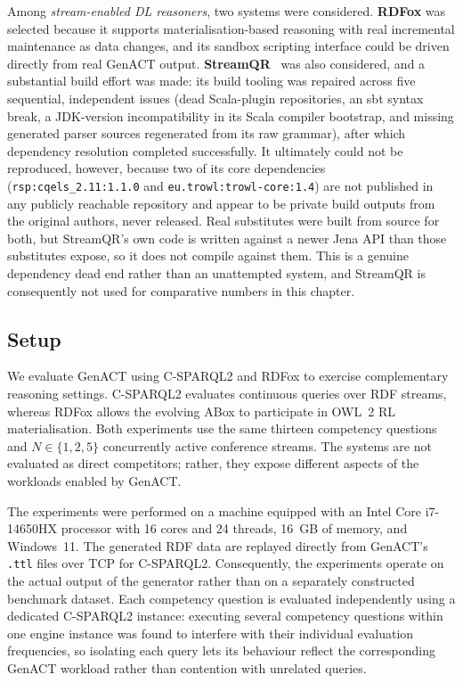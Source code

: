 Among \emph{stream-enabled DL reasoners}, two systems were considered.
\textbf{RDFox} was selected because it supports materialisation-based
reasoning with real incremental maintenance as data changes, and its sandbox
scripting interface could be driven directly from real GenACT output.
\textbf{StreamQR}~\cite{streamqr} was also considered, and a substantial
build effort was made: its build tooling was repaired across five sequential,
independent issues (dead Scala-plugin repositories, an sbt syntax break, a
JDK-version incompatibility in its Scala compiler bootstrap, and missing
generated parser sources regenerated from its raw grammar), after which
dependency resolution completed successfully. It ultimately could not be
reproduced, however, because two of its core dependencies
(\texttt{rsp:cqels\_2.11:1.1.0} and \texttt{eu.trowl:trowl-core:1.4}) are not
published in any publicly reachable repository and appear to be private build
outputs from the original authors, never released. Real substitutes were
built from source for both, but StreamQR's own code is written against a
newer Jena API than those substitutes expose, so it does not compile against
them. This is a genuine dependency dead end rather than an unattempted
system, and StreamQR is consequently not used for comparative numbers in this
chapter.


\subsection{Setup}
\label{subsec:genact-experimental-setup}

We evaluate GenACT using C-SPARQL2 and RDFox to exercise complementary
reasoning settings. C-SPARQL2 evaluates continuous queries over RDF streams,
whereas RDFox allows the evolving ABox to participate in OWL~2 RL
materialisation. Both experiments use the same thirteen competency questions
and $N\in\{1,2,5\}$ concurrently active conference streams. The systems are not
evaluated as direct competitors; rather, they expose different aspects of the
workloads enabled by GenACT.

The experiments were performed on a machine equipped with an Intel Core
i7-14650HX processor with 16 cores and 24 threads, 16~GB of memory, and
Windows~11. The generated RDF data are replayed directly from GenACT's
\texttt{.ttl} files over TCP for C-SPARQL2. Consequently, the experiments
operate on the actual output of the generator rather than on a separately
constructed benchmark dataset. Each competency question is evaluated
independently using a dedicated C-SPARQL2 instance: executing several
competency questions within one engine instance was found to interfere with
their individual evaluation frequencies, so isolating each query lets its
behaviour reflect the corresponding GenACT workload rather than contention
with unrelated queries.

